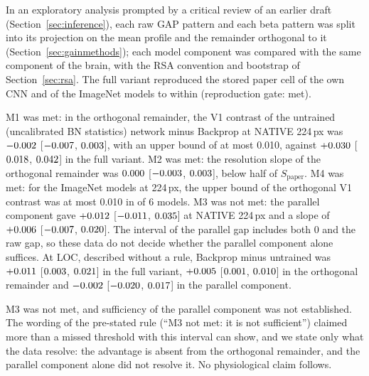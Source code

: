 In an exploratory analysis prompted by a critical review of an earlier draft (Section~\ref{sec:inference}),
each raw GAP pattern and each beta pattern was split into its projection on the mean profile
and the remainder orthogonal to it (Section~\ref{sec:gainmethods}); each model component was
compared with the same component of the brain, with the RSA convention and bootstrap of
Section~\ref{sec:rsa}. The full variant reproduced the stored paper cell of the own CNN and
of the ImageNet models to within \MpGateMaxDelta{} (reproduction gate: met).

M1 was met: in the orthogonal remainder, the V1 contrast of the untrained (uncalibrated BN
statistics) network minus Backprop at NATIVE 224\,px was $-0.002$
[$-0.007$, $0.003$], with an upper bound of
at most 0.010, against $+0.030$ [$0.018$,
$0.042$] in the full variant. M2 was met: the resolution slope of
the orthogonal remainder was $0.000$ [$-0.003$, $0.003$],
below half of $S_{\mathrm{paper}}$. M4 was met: for the ImageNet models at 224\,px, the upper
bound of the orthogonal V1 contrast was at most 0.010 in \MpMFourModels{} of 6 models. M3 was
not met: the parallel component gave $+0.012$
[$-0.011$, $0.035$] at NATIVE 224\,px and a
slope of $+0.006$ [$-0.007$, $0.020$]. The interval of the
parallel gap includes both 0 and the raw gap, so these data do not decide whether the
parallel component alone suffices. At LOC, described without a rule, Backprop minus
untrained was $+0.011$ [$0.003$, $0.021$] in the full variant,
$+0.005$ [$0.001$, $0.010$] in the orthogonal remainder and
$-0.002$ [$-0.020$, $0.017$] in the parallel component.

M3 was not met, and sufficiency of the parallel component was not established. The wording
of the pre-stated rule (``M3 not met: it is not sufficient'') claimed more than a missed
threshold with this interval can show, and we state only what the data resolve: the
advantage is absent from the orthogonal remainder, and the parallel component alone did not
resolve it. No physiological claim follows.

